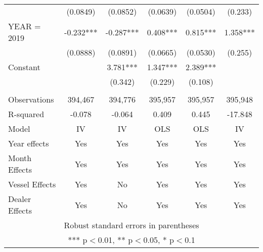 \begin{tabular}{lccccc}
 & (0.0849) & (0.0852) & (0.0639) & (0.0504) & (0.233) \\
YEAR = 2019 & -0.232*** & -0.287*** & 0.408*** & 0.815*** & 1.358*** \\
 & (0.0888) & (0.0891) & (0.0665) & (0.0530) & (0.255) \\
Constant &  & 3.781*** & 1.347*** & 2.389*** &  \\
 &  & (0.342) & (0.229) & (0.108) &  \\
 &  &  &  &  &  \\
Observations & 394,467 & 394,776 & 395,957 & 395,957 & 395,948 \\
R-squared & -0.078 & -0.064 & 0.409 & 0.445 & -17.848 \\
Model & IV & IV & OLS & OLS & IV \\
Year effects & Yes & Yes & Yes & Yes & Yes \\
Month Effects & Yes & Yes & Yes & Yes & Yes \\
Vessel Effects & Yes & No & Yes & Yes & Yes \\
 Dealer Effects & Yes & No & Yes & Yes & Yes \\ \hline
\multicolumn{6}{c}{ Robust standard errors in parentheses} \\
\multicolumn{6}{c}{ *** p$<$0.01, ** p$<$0.05, * p$<$0.1} \\
\end{tabular}
